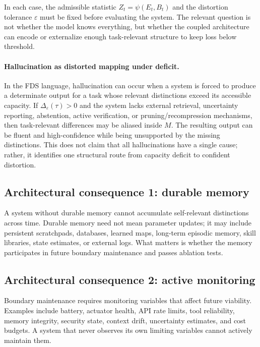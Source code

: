 \documentclass[10pt,a4paper,twocolumn,aps,prl]{revtex4-2}
\begin{document}
In each case, the admissible statistic $Z_t=\psi(E_t,B_t)$ and the distortion tolerance $\varepsilon$ must be fixed before evaluating the system. The relevant question is not whether the model knows everything, but whether the coupled architecture can encode or externalize enough task-relevant structure to keep loss below threshold.

\paragraph{Hallucination as distorted mapping under deficit.}
In the FDS language, hallucination can occur when a system is forced to produce a determinate output for a task whose relevant distinctions exceed its accessible capacity. If $\Delta_\varepsilon(\tau)>0$ and the system lacks external retrieval, uncertainty reporting, abstention, active verification, or pruning/recompression mechanisms, then task-relevant differences may be aliased inside $M$. The resulting output can be fluent and high-confidence while being unsupported by the missing distinctions. This does not claim that all hallucinations have a single cause; rather, it identifies one structural route from capacity deficit to confident distortion.

\subsection{Architectural consequence 1: durable memory}

A system without durable memory cannot accumulate self-relevant distinctions across time. Durable memory need not mean parameter updates; it may include persistent scratchpads, databases, learned maps, long-term episodic memory, skill libraries, state estimates, or external logs. What matters is whether the memory participates in future boundary maintenance and passes ablation tests.

\subsection{Architectural consequence 2: active monitoring}

Boundary maintenance requires monitoring variables that affect future viability. Examples include battery, actuator health, API rate limits, tool reliability, memory integrity, security state, context drift, uncertainty estimates, and cost budgets. A system that never observes its own limiting variables cannot actively maintain them.
\end{document}
